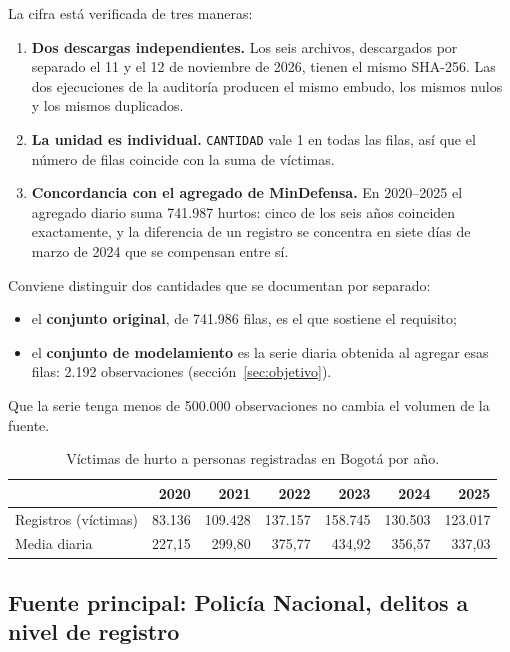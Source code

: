 \documentclass[12pt,letterpaper]{article}
\begin{document}
La cifra está verificada de tres maneras:
\begin{enumerate}
  \item \textbf{Dos descargas independientes.} Los seis archivos, descargados por separado el 11 y el 12 de noviembre de 2026, tienen el mismo SHA-256. Las dos ejecuciones de la auditoría producen el mismo embudo, los mismos nulos y los mismos duplicados.
  \item \textbf{La unidad es individual.} \texttt{CANTIDAD} vale 1 en todas las filas, así que el número de filas coincide con la suma de víctimas.
  \item \textbf{Concordancia con el agregado de MinDefensa.} En 2020--2025 el agregado diario suma 741.987 hurtos: cinco de los seis años coinciden exactamente, y la diferencia de un registro se concentra en siete días de marzo de 2024 que se compensan entre sí.
\end{enumerate}

Conviene distinguir dos cantidades que se documentan por separado:
\begin{itemize}
  \item el \textbf{conjunto original}, de 741.986 filas, es el que sostiene el requisito;
  \item el \textbf{conjunto de modelamiento} es la serie diaria obtenida al agregar esas filas: 2.192 observaciones (sección~\ref{sec:objetivo}).
\end{itemize}
Que la serie tenga menos de 500.000 observaciones no cambia el volumen de la fuente.

\begin{table}[H]
\centering
\caption{Víctimas de hurto a personas registradas en Bogotá por año.}\label{tab:anual}
\begin{tabular}{@{}lrrrrrr@{}}
\toprule
 & \textbf{2020} & \textbf{2021} & \textbf{2022} & \textbf{2023} & \textbf{2024} & \textbf{2025} \\
\midrule
Registros (víctimas) & 83.136 & 109.428 & 137.157 & 158.745 & 130.503 & 123.017 \\
Media diaria & 227,15 & 299,80 & 375,77 & 434,92 & 356,57 & 337,03 \\
\bottomrule
\end{tabular}
\end{table}

\subsection{Fuente principal: Policía Nacional, delitos a nivel de registro}
\end{document}
